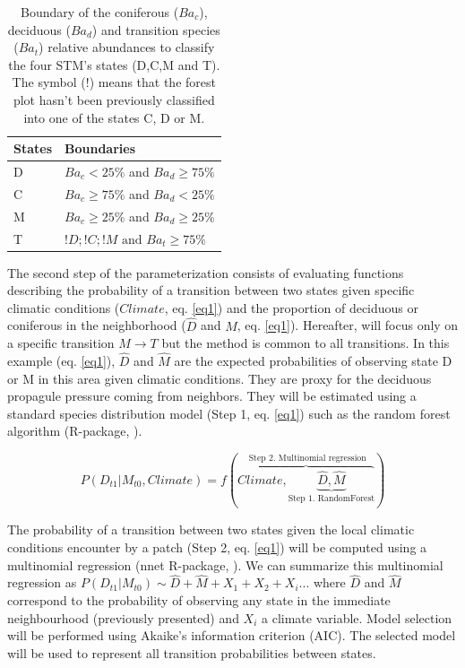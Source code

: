 \begin{table}[h]
\vspace{-1em}
\centering
\caption{Boundary of the coniferous ($Ba_c$), deciduous ($Ba_d$) and transition species ($Ba_t$) relative abundances to classify the four STM's states (D,C,M and T). The symbol ($!$) means that the forest plot hasn't been previously classified into one of the states C, D or M.}
\vspace{-1em}
\small
\begin{tabular}{|l|l|}
	\hline
	\textbf{States}  & \textbf{Boundaries}                            \\
	\hline
	D & $Ba_c< 25\%$ and $Ba_d \geq 75\%$    \\
	C & $Ba_c \geq 75\%$ and $Ba_d < 25\%$    \\
	M & $Ba_c \geq 25\%$ and $Ba_d \geq 25\%$ \\
	T & $!D;!C;!M \text{ and }  Ba_t  \geq 75\%$ \\
	\hline                               
\end{tabular}

\label{bound}
\end{table}

The second step of the parameterization consists of evaluating functions
describing the probability of a transition between two states given specific
climatic conditions ($Climate$, eq. \ref{eq1}) and the proportion of deciduous
or coniferous in the neighborhood ($\hat{D}$ and $\hat{M}$, eq. \ref{eq1}).
Hereafter, will focus only on a specific transition $M \rightarrow T$ but the
method is common to  all transitions. In this example (eq. \ref{eq1}),
$\hat{D}$ and $\hat{M}$ are the expected probabilities of observing state D or
M in this area given climatic conditions. They are proxy for the deciduous
propagule pressure coming from neighbors. They will be estimated using  a
standard species distribution model (Step 1, eq. \ref{eq1}) such as the random
forest algorithm (R-package, \cite{Liaw2002a}).

\begin{equation}
	P(D_{t1}|M_{t0}, Climate) = f(\overbrace{Climate, \underbrace{\hat{D}, \hat{M}}_\text{Step 1. RandomForest}}^\text{ Step 2. Multinomial regression})
\label{eq1}
\end{equation}

The probability of a transition between two states given the local climatic
conditions encounter by a patch (Step 2, eq. \ref{eq1}) will be computed using
a multinomial regression (nnet R-package, \cite{Venables2002}). We can
summarize this multinomial regression as $P(D_{t1}|M_{t0}) \sim \hat{D} +
\hat{M} + X_1+X_2+X_i... $ where $\hat{D}$ and $\hat{M}$ correspond to the
probability of observing any state in the immediate neighbourhood (previously
presented) and $X_i$ a climate variable. Model selection will be performed
using Akaike's information criterion (AIC). The selected model will be used to
represent all transition probabilities between states.   \\

